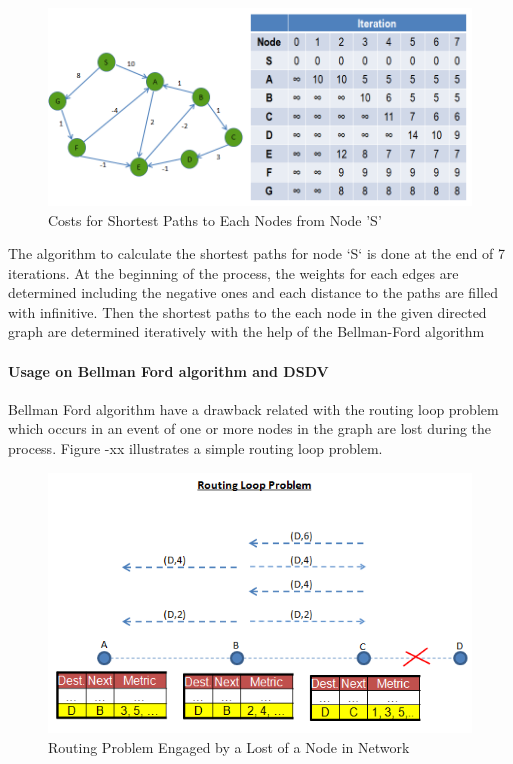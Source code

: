 \documentclass[twoside]{article}
\begin{document}
\begin{figure}[H]
	\caption{Costs for Shortest Paths to Each Nodes from Node 'S'}
	\centering
	\includegraphics[scale = 0.65]{bellman}
\end{figure}

	
	The algorithm to calculate the shortest paths for node `S` is done at the end of 7 iterations. At the beginning of the process, the weights for each edges are determined including the negative ones and each distance to the paths are filled with infinitive. Then the shortest paths to the each node in the given directed graph are determined iteratively with the help of the Bellman-Ford algorithm 
	
	
	\paragraph{Usage on Bellman Ford algorithm and DSDV}
	
	Bellman Ford algorithm have a drawback related with the routing loop problem which occurs in an event of one or more nodes in the graph are lost during the process. Figure -xx illustrates a simple routing loop problem. 
	
	\begin{figure}[H]
		\caption{Routing Problem Engaged by a Lost of a Node in Network}
		\centering
		\includegraphics[scale = 0.65]{routing_problem}
	\end{figure}
\end{document}
